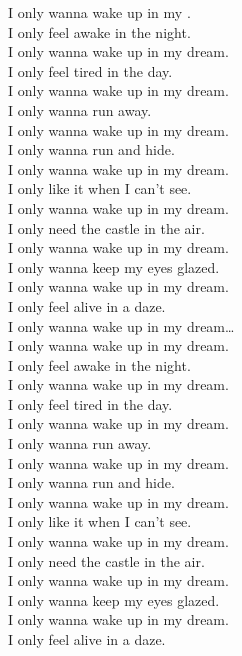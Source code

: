 


I only wanna wake up in my . \\
I only feel awake in the night. \\
I only wanna wake up in my dream. \\
I only feel tired in the day. \\
I only wanna wake up in my dream. \\
I only wanna run away. \\
I only wanna wake up in my dream. \\
I only wanna run and hide. \\

I only wanna wake up in my dream. \\
I only like it when I can't see. \\
I only wanna wake up in my dream. \\
I only need the castle in the air. \\
I only wanna wake up in my dream. \\
I only wanna keep my eyes glazed. \\
I only wanna wake up in my dream. \\
I only feel alive in a daze. \\

I only wanna wake up in my dream… \\

I only wanna wake up in my dream. \\
I only feel awake in the night. \\
I only wanna wake up in my dream. \\
I only feel tired in the day. \\
I only wanna wake up in my dream. \\
I only wanna run away. \\
I only wanna wake up in my dream. \\
I only wanna run and hide. \\

I only wanna wake up in my dream. \\
I only like it when I can't see. \\
I only wanna wake up in my dream. \\
I only need the castle in the air. \\
I only wanna wake up in my dream. \\
I only wanna keep my eyes glazed. \\
I only wanna wake up in my dream. \\
I only feel alive in a daze. \\

